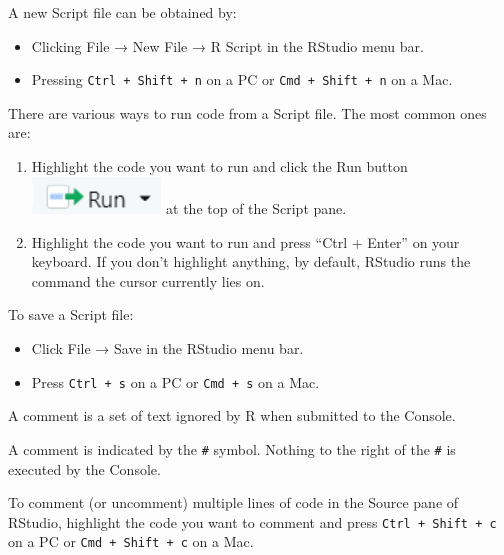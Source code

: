\documentclass[
]{book}
\providecommand{\tightlist}{%
  \setlength{\itemsep}{0pt}\setlength{\parskip}{0pt}}
\theoremstyle{definition}
\theoremstyle{definition}
\theoremstyle{definition}
\theoremstyle{definition}
\theoremstyle{remark}
\begin{document}
A new Script file can be obtained by:

\begin{itemize}
\tightlist
\item
  Clicking File → New File → R Script in the RStudio menu bar.
\item
  Pressing \texttt{Ctrl\ +\ Shift\ +\ n} on a PC or \texttt{Cmd\ +\ Shift\ +\ n} on a Mac.
\end{itemize}

There are various ways to run code from a Script file. The most common ones are:

\begin{enumerate}
\def\labelenumi{\arabic{enumi}.}
\tightlist
\item
  Highlight the code you want to run and click the Run button
  \includegraphics[width=1.35in]{pictures/run_button} at the top of the Script pane.
\item
  Highlight the code you want to run and press ``Ctrl + Enter'' on your keyboard. If you don't highlight anything, by default, RStudio runs the command the cursor currently lies on.
\end{enumerate}

To save a Script file:

\begin{itemize}
\tightlist
\item
  Click File → Save in the RStudio menu bar.
\item
  Press \texttt{Ctrl\ +\ s} on a PC or \texttt{Cmd\ +\ s} on a Mac.
\end{itemize}

A comment is a set of text ignored by R when submitted to the Console.

A comment is indicated by the \texttt{\#} symbol. Nothing to the right of the \texttt{\#} is executed by the Console.

To comment (or uncomment) multiple lines of code in the Source pane of RStudio, highlight the code you want to comment and press \texttt{Ctrl\ +\ Shift\ +\ c} on a PC or \texttt{Cmd\ +\ Shift\ +\ c} on a Mac.
\end{document}
